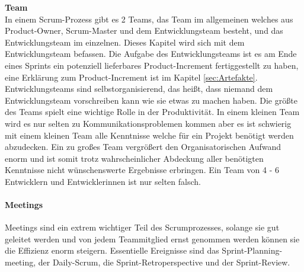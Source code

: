			\textbf{Team} \\
			In einem Scrum-Prozess gibt es 2 Teams, das Team im allgemeinen welches aus Product-Owner, Scrum-Master und dem Entwicklungsteam besteht, und das Entwicklungsteam im einzelnen. Dieses Kapitel wird sich mit dem Entwicklungsteam befassen. Die Aufgabe des Entwicklungsteams ist es am Ende eines Sprints ein potenziell lieferbares Product-Increment fertiggestellt zu haben, eine Erklärung zum Product-Increment ist im Kapitel \ref{sec:Artefakte}. Entwicklungsteams sind selbstorganisierend, das heißt, dass niemand dem Entwicklungsteam vorschreiben kann wie sie etwas zu machen haben.
			Die größte des Teams spielt eine wichtige Rolle in der Produktivität. In einem kleinen Team wird es nur selten zu Kommunikationsproblemen kommen aber es ist schwierig mit einem kleinen Team alle Kenntnisse welche für ein Projekt benötigt werden abzudecken. Ein zu großes Team vergrößert den Organisatorischen Aufwand enorm und ist somit trotz wahrscheinlicher Abdeckung aller benötigten Kenntnisse nicht wünschenswerte Ergebnisse erbringen. Ein Team von 4 - 6 Entwicklern und Entwicklerinnen ist nur selten falsch. \textcite{ScrumTeam} \\
			
		
	\paragraph{Meetings}
	\label{sec:Meetings}
		Meetings sind ein extrem wichtiger Teil des Scrumprozesses, solange sie gut geleitet werden und von jedem Teammitglied ernst genommen werden können sie die Effizienz enorm steigern. Essentielle Ereignisse sind das Sprint-Planning-meeting, der Daily-Scrum, die Sprint-Retroperspective und der Sprint-Review. 
